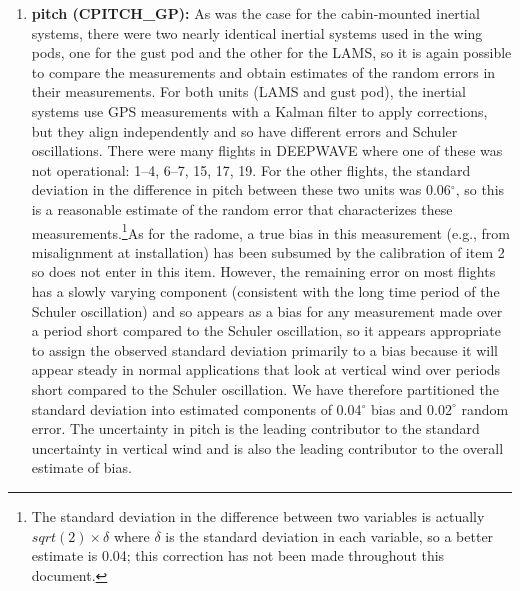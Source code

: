 \documentclass[12pt,twoside,english]{article}\usepackage[]{graphicx}\usepackage[]{color}
\let\OrgIndex\index
\renewcommand*{\index}[1]{\OrgIndex{#1}}
\begin{document}
\begin{enumerate}
\item \textbf{pitch (CPITCH\_GP):} As was the case for the cabin-mounted inertial systems, there were two nearly identical inertial systems used in the wing pods, one for the gust pod and the other for the LAMS, so it is again possible to compare the measurements and obtain estimates of the random errors in their measurements. For both units (LAMS and gust pod), the inertial systems use GPS measurements with a Kalman filter to apply corrections, but they align independently and so have different errors and Schuler oscillations. There were many flights in DEEPWAVE where one of these was not operational: 1--4, 6--7, 15, 17, 19. For the other flights, the standard deviation in the difference in pitch between these two units was 0.06$^{\circ}$, so this is a reasonable estimate of the random error that characterizes these measurements.\footnote{The standard deviation in the difference between two variables is actually $sqrt(2)\times\delta$ where $\delta$ is the standard deviation in each variable, so a better estimate is 0.04; this correction has not been made throughout this document.}As for the radome, a true bias in this measurement (e.g., from misalignment at installation) has been subsumed by the calibration of item 2 so does not enter in this item. However, the remaining error on most flights has a slowly varying component (consistent with the long time period of the Schuler oscillation) and so appears as a bias for any measurement made over a period short compared to the Schuler oscillation, so it appears appropriate to assign the observed standard deviation primarily to a bias because it will appear steady in normal applications that look at vertical wind over periods short compared to the Schuler oscillation. We have therefore partitioned the standard deviation into estimated components of 0.04$^{\circ}$ bias and $0.02^{\circ}$ random error. The uncertainty in pitch is the leading contributor to the standard uncertainty in vertical wind and is also the leading contributor to the overall estimate of bias. 


\end{enumerate}
\end{document}
